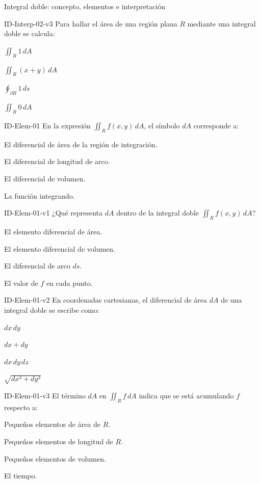 \documentclass[a4,11pt]{aleph-notas}
\begin{document}
\begin{quiz}{Integral doble: concepto, elementos e interpretación}
\begin{multi}[]%
    {ID-Interp-02-v3}
    Para hallar el área de una región plana $R$ mediante una integral doble se calcula:
    \item* $\displaystyle\iint_R 1\,dA$
    \item $\displaystyle\iint_R (x+y)\,dA$
    \item $\displaystyle\oint_{\partial R} 1\,ds$
    \item $\displaystyle\iint_R 0\,dA$
\end{multi}

\begin{multi}[]%
    {ID-Elem-01}
    En la expresión $\displaystyle\iint_R f(x,y)\,dA$, el símbolo $dA$ corresponde a:
    \item* El diferencial de área de la región de integración.
    \item El diferencial de longitud de arco.
    \item El diferencial de volumen.
    \item La función integrando.
\end{multi}

\begin{multi}[]%
    {ID-Elem-01-v1}
    ¿Qué representa $dA$ dentro de la integral doble $\displaystyle\iint_R f(x,y)\,dA$?
    \item* El elemento diferencial de área.
    \item El elemento diferencial de volumen.
    \item El diferencial de arco $ds$.
    \item El valor de $f$ en cada punto.
\end{multi}

\begin{multi}[]%
    {ID-Elem-01-v2}
    En coordenadas cartesianas, el diferencial de área $dA$ de una integral doble se escribe como:
    \item* $dx\,dy$
    \item $dx+dy$
    \item $dx\,dy\,dz$
    \item $\sqrt{dx^2+dy^2}$
\end{multi}

\begin{multi}[]%
    {ID-Elem-01-v3}
    El término $dA$ en $\displaystyle\iint_R f\,dA$ indica que se está acumulando $f$ respecto a:
    \item* Pequeños elementos de área de $R$.
    \item Pequeños elementos de longitud de $R$.
    \item Pequeños elementos de volumen.
    \item El tiempo.
\end{multi}


\end{quiz}
\end{document}
